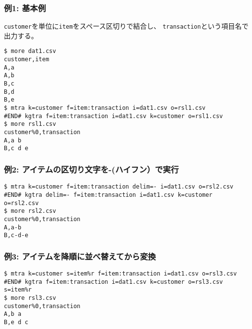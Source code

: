 \subsubsection*{例1: 基本例}

\verb|customer|を単位に\verb|item|をスペース区切りで結合し、
\verb|transaction|という項目名で出力する。


\begin{Verbatim}[baselinestretch=0.7,frame=single]
$ more dat1.csv
customer,item
A,a
A,b
B,c
B,d
B,e
$ mtra k=customer f=item:transaction i=dat1.csv o=rsl1.csv
#END# kgtra f=item:transaction i=dat1.csv k=customer o=rsl1.csv
$ more rsl1.csv
customer%0,transaction
A,a b
B,c d e
\end{Verbatim}
\subsubsection*{例2: アイテムの区切り文字を-(ハイフン）で実行}



\begin{Verbatim}[baselinestretch=0.7,frame=single]
$ mtra k=customer f=item:transaction delim=- i=dat1.csv o=rsl2.csv
#END# kgtra delim=- f=item:transaction i=dat1.csv k=customer o=rsl2.csv
$ more rsl2.csv
customer%0,transaction
A,a-b
B,c-d-e
\end{Verbatim}
\subsubsection*{例3: アイテムを降順に並べ替えてから変換}



\begin{Verbatim}[baselinestretch=0.7,frame=single]
$ mtra k=customer s=item%r f=item:transaction i=dat1.csv o=rsl3.csv
#END# kgtra f=item:transaction i=dat1.csv k=customer o=rsl3.csv s=item%r
$ more rsl3.csv
customer%0,transaction
A,b a
B,e d c
\end{Verbatim}
